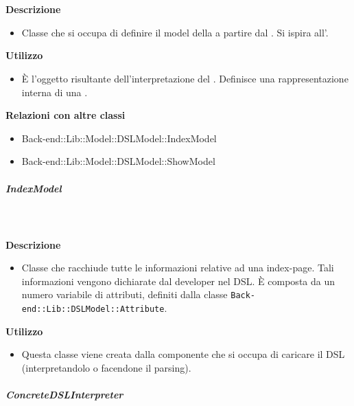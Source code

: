 				\textbf{\\ \\ Descrizione} 
					\begin{itemize}
						\item[] Classe che si occupa di definire il model della  a partire dal . Si ispira all'.
					\end{itemize}      
				\textbf{Utilizzo}  
					\begin{itemize}
						\item[] È l'oggetto risultante dell'interpretazione del . Definisce una rappresentazione interna di una .
					\end{itemize}
					\textbf{Relazioni con altre classi}
					\begin{itemize}
							\item{Back-end::Lib::Model::DSLModel::IndexModel}
							\item{Back-end::Lib::Model::DSLModel::ShowModel}
					\end{itemize}
			\subparagraph{IndexModel}
				
				\textbf{\\ \\ Descrizione} 
					\begin{itemize}
						\item[] Classe che racchiude tutte le informazioni relative ad una index-page. Tali informazioni vengono dichiarate dal developer nel DSL. È composta da un numero variabile di attributi, definiti dalla classe \texttt{Back-end::Lib::DSLModel::Attribute}.
					\end{itemize}      
				\textbf{Utilizzo}  
					\begin{itemize}
						\item[] Questa classe viene creata dalla componente che si occupa di caricare il DSL (interpretandolo o facendone il parsing).
					\end{itemize}
			\subparagraph{ConcreteDSLInterpreter}
				
